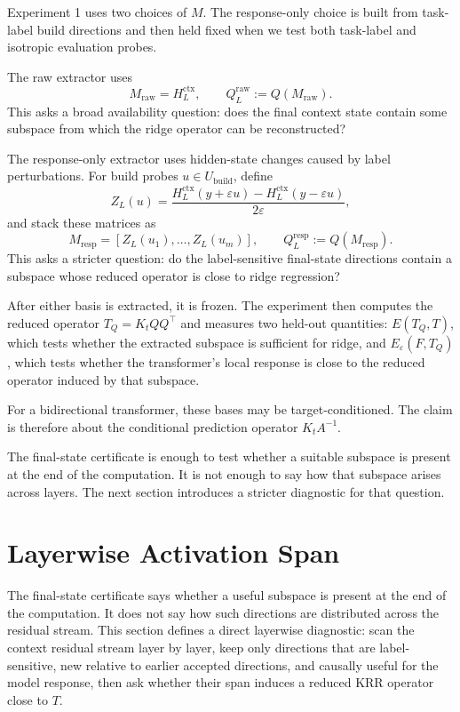 \documentclass[11pt]{article}
\begin{document}
Experiment 1 uses two choices of \(M\). The response-only choice is built from task-label build
directions and then held fixed when we test both task-label and isotropic evaluation probes.

The raw extractor uses
\[
M_{\mathrm{raw}}=H_L^{\mathrm{ctx}},
\qquad
Q_L^{\mathrm{raw}}:=Q(M_{\mathrm{raw}}).
\]
This asks a broad availability question: does the final context state contain some subspace from
which the ridge operator can be reconstructed?

The response-only extractor uses hidden-state changes caused by label perturbations. For build
probes \(u\in U_{\mathrm{build}}\), define
\[
Z_L(u)=
\frac{
H_L^{\mathrm{ctx}}(y+\varepsilon u)-H_L^{\mathrm{ctx}}(y-\varepsilon u)
}{2\varepsilon},
\]
and stack these matrices as
\[
M_{\mathrm{resp}}=[Z_L(u_1),\ldots,Z_L(u_m)],
\qquad
Q_L^{\mathrm{resp}}:=Q(M_{\mathrm{resp}}).
\]
This asks a stricter question: do the label-sensitive final-state directions contain a subspace whose
reduced operator is close to ridge regression?

After either basis is extracted, it is frozen. The experiment then computes the reduced operator
\(T_Q=K_tQQ^\top\) and measures two held-out quantities: \(E(T_Q,T)\), which tests whether the
extracted subspace is sufficient for ridge, and \(E_\varepsilon(F,T_Q)\), which tests whether the
transformer's local response is close to the reduced operator induced by that subspace.

For a bidirectional transformer, these bases may be target-conditioned. The claim is therefore
about the conditional prediction operator \(K_tA^{-1}\).

The final-state certificate is enough to test whether a suitable subspace is present at the end of
the computation. It is not enough to say how that subspace arises across layers. The next section
introduces a stricter diagnostic for that question.

\section{Layerwise Activation Span}

The final-state certificate says whether a useful subspace is present at the end of the computation.
It does not say how such directions are distributed across the residual stream. This section defines
a direct layerwise diagnostic: scan the context residual stream layer by layer, keep only directions
that are label-sensitive, new relative to earlier accepted directions, and causally useful for the
model response, then ask whether their span induces a reduced KRR operator close to \(T\).
\end{document}
